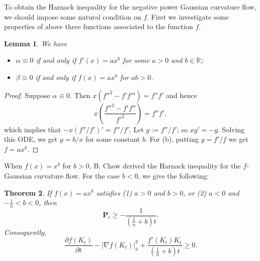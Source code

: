 \documentclass{amsart}
\newtheorem{theorem}{Theorem}[section]
\newtheorem{lemma}[theorem]{Lemma}
\theoremstyle{definition}
\theoremstyle{remark}
\numberwithin{equation}{section}
\begin{document}
To obtain the Harnack inequality for the negative power Gaussian curvature flow,
we should impose some natural condition on $f$. First we investigate some properties of above three functions associated to the function $f$.

\begin{lemma} \label{l3.6}We have
\begin{itemize}

\item[(a)] $\alpha\equiv0$ if and only if $f'(x)=ax^{b}$ for some $a>0$ and $b\in\mathbb{R}$;

\item[(b)] $\beta\equiv0$ if and only if $f(x)=ax^{b}$ for $ab>0$.

\end{itemize}
\end{lemma}

\begin{proof} Suppose $\alpha\equiv0$. Then $x(f''^{2}-f'f''')=f''f'$ and hence
\begin{equation*}
x\left(\frac{f''^{2}-f'f''}{f'^{2}}\right)=f''f',
\end{equation*}
which implies that $-x(f''/f')'=f''/f'$. Let $g:=f''/f'$; so $xg'=-g$. Solving this ODE, we get $g=b/x$ for some constant $b$. For (b), putting $g=f'/f$ we get $f=ax^{b}$.
\end{proof}

When $f(x)=x^{b}$ for $b>0$, B. Chow \cite{C2} derived the Harnack inequality
for the $f$-Gaussian curvature flow. For the case $b<0$, we give the following:

\begin{theorem} \label{t3.7} If $f(x)=ax^{b}$ satisfies (1) $a>0$ and $b>0$, or (2) $a<0$ and $-\frac{1}{n}<b<0$, then
\begin{equation}
\mathbf{P}_{t}\geq-\frac{1}{\left(\frac{1}{n}+b\right)t}.\label{3.16}
\end{equation}
Consequently,
\begin{equation}
\frac{\partial f(K_{t})}{\partial t}-|\nabla f(K_{t})|^{2}_{h}+\frac{f'(K_{t})K_{t}}
{\left(\frac{1}{n}+b\right)t}\geq0.\label{3.17}
\end{equation}
\end{theorem}
\end{document}
